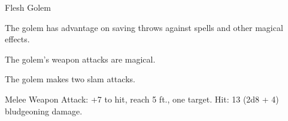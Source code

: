 \begin{monsterbox}{Flesh Golem}
\begin{monsteraction}
The golem has advantage on saving throws against spells and other magical effects.
\end{monsteraction}
\begin{monsteraction}
The golem's weapon attacks are magical.
\end{monsteraction}
\begin{monsteraction}[Multiattack]
The golem makes two slam attacks.
\end{monsteraction}
\begin{monsteraction}[Slam]
Melee Weapon Attack: +7 to hit, reach 5 ft., one target. Hit: 13 (2d8 + 4) bludgeoning damage.
\end{monsteraction}
\end{monsterbox}